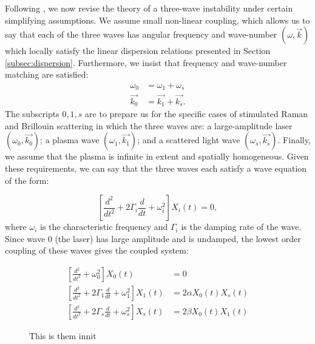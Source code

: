 Following \citet{Nishikawa1976}, we now revise the theory of a three-wave instability under certain simplifying assumptions. We assume small non-linear coupling, which allows us to say that each of the three waves has angular frequency and wave-number $(\omega,\vec{k})$ which locally satisfy the linear dispersion relations presented in Section \ref{subsec:dispersion}. Furthermore, we insist that frequency and wave-number matching are satisfied:
\begin{subequations}\label{eqn:manley-rowe}
\begin{align}
\omega_0 &= \omega_1 + \omega_s \\
\vec{k_0} &= \vec{k_1} + \vec{k_s}.
\end{align}
\end{subequations} The subscripts $0,1,s$ are to prepare us for the specific cases of stimulated Raman and Brillouin scattering in which the three waves are: a large-amplitude laser $(\omega_0,\vec{k_0})$; a plasma wave $(\omega_1,\vec{k_1})$; and a scattered light wave $(\omega_s,\vec{k_s})$. Finally, we assume that the plasma is infinite in extent and spatially homogeneous. Given these requirements, we can say that the three waves each satisfy a wave equation of the form:

\begin{equation}
\left[ \frac{d^{2}}{d t^{2}}+2 \Gamma_{i} \frac{d}{d t}+\omega_{i}^{2} \right] X_{i}(t)=0,
\end{equation} where $\omega_i$ is the characteristic frequency and $\Gamma_i$ is the damping rate of the wave. Since wave 0 (the laser) has large amplitude and is undamped, the lowest order coupling of these waves gives the coupled system:

\begin{subequations}\label{eqn:coupled-mode}
\begin{align}
\left[ \frac{d^{2}}{d t^{2}}+\omega_{0}^{2} \right] X_{0}(t) & = 0 \\
\left[ \frac{d^{2}}{d t^{2}}+2 \Gamma_{1} \frac{d}{d t}+\omega_{1}^{2} \right] X_{1}(t) &= 2\alpha X_0(t)X_s(t) \\
\left[ \frac{d^{2}}{d t^{2}}+2 \Gamma_{s} \frac{d}{d t}+\omega_{s}^{2} \right] X_{s}(t) &= 2\beta X_0(t)X_1(t)
\end{align}
\end{subequations} 



\begin{figure}[ht]
   \centering
    \caption{This is them innit}
    \label{fig:3wave_instabilities}
\end{figure}{}

